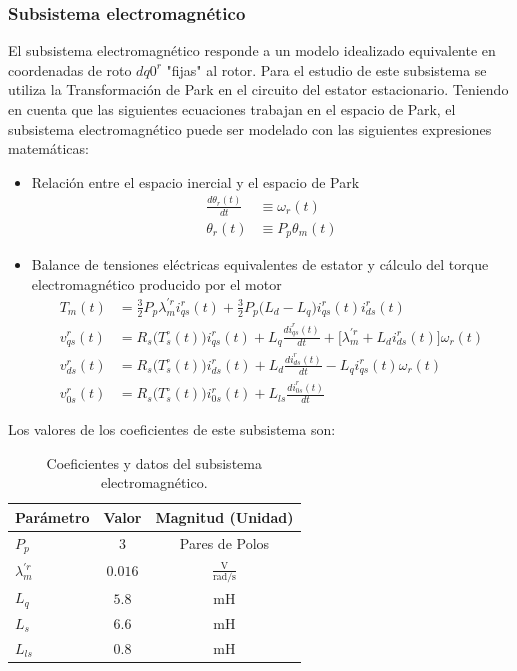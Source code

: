 \documentclass[blue,fullpaper]{ludusofficial}  %
\begin{document}
\subsubsection{Subsistema electromagnético}
El subsistema electromagnético responde a un modelo idealizado equivalente en coordenadas de roto $dq0^r$ "fijas" al rotor. Para el estudio de este subsistema se utiliza la Transformación de Park en el circuito del estator estacionario. Teniendo en cuenta que las siguientes ecuaciones trabajan en el espacio de Park, el subsistema electromagnético puede ser modelado con las siguientes expresiones matemáticas:

\begin{itemize}
    \item Relación entre el espacio inercial y el espacio de Park
    \begin{align}
    \frac{d\theta_{r}(t)}{dt}  & \equiv \omega_{r}(t) \label{SubElec1}\\
    \theta_{r}(t)  & \equiv P_{p} \theta_{m}(t)  \label{SubElec2}
    \end{align}
    \item Balance de tensiones eléctricas equivalentes de estator y cálculo del torque electromagnético producido por el motor
    \begin{align}
        T_{m}(t) &  = \frac{3}{2}P_{p} \lambda_{m}^{'r} i_{qs}^{r}(t) + \frac{3}{2} P_{p} \Big( L_{d} - L_{q} \Big) i_{qs}^{r}(t) i_{ds}^{r}(t) \label{SubElec3} \\
        v_{qs}^{r}(t) & = R_{s} \Big( T_{s}^{\circ} (t) \Big) i_{qs}^{r}(t) + L_{q} \frac{di_{qs}^{r}(t)}{dt}  + \Big[ \lambda_{m}^{'r} + L_{d} i_{ds}^{r}(t) \Big] \omega_{r}(t)\label{SubElec4} \\
        v_{ds}^{r}(t) & = R_{s} \Big( T_{s}^{\circ} (t) \Big) i_{ds}^{r}(t) + L_{d} \frac{di_{ds}^{r}(t)}{dt} - L_{q}i_{qs}^{r}(t) \omega_{r}(t)   \label{SubElec5}\\
        v_{0s}^{r}(t) & = R_{s} \Big( T_{s}^{\circ} (t) \Big) i_{0s}^{r}(t) + L_{ls} \frac{di_{0s}^{r}(t)}{dt} \label{SubElec6}
    \end{align}
\end{itemize}

Los valores de los coeficientes de este subsistema son:

\begin{table}[htbp]
    \centering
    \caption{Coeficientes y datos del subsistema electromagnético.}
    \label{tab:parametros_carga}
    \begin{tabular}{lcc}
        \hline
        \textbf{Parámetro} & \textbf{Valor} & \textbf{Magnitud (Unidad)} \\
        \hline
        $P_p$ & $3$ & Pares de Polos \\
        $\lambda_{m}^{'r}$ & $0.016$ & $\mathrm{\frac{V}{rad/s}}$ \\
        $L_q$ & $5.8$ & $\mathrm{mH}$ \\
        $L_s$ & $6.6$ & $\mathrm{mH}$ \\
        $L_{ls}$ & $0.8$ & $\mathrm{mH}$ \\
        \hline
    \end{tabular}
\end{table}
\end{document}
